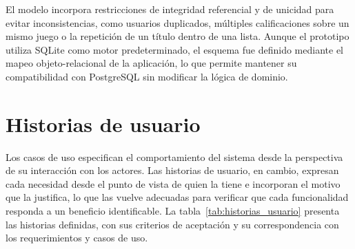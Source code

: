 El modelo incorpora restricciones de integridad referencial y de unicidad para evitar inconsistencias, como usuarios duplicados, múltiples calificaciones sobre un mismo juego o la repetición de un título dentro de una lista. Aunque el prototipo utiliza SQLite como motor predeterminado, el esquema fue definido mediante el mapeo objeto-relacional de la aplicación, lo que permite mantener su compatibilidad con PostgreSQL sin modificar la lógica de dominio.

\section{Historias de usuario}\label{sec:historias_usuario}

Los casos de uso especifican el comportamiento del sistema desde la perspectiva de su interacción con los actores. Las historias de usuario, en cambio, expresan cada necesidad desde el punto de vista de quien la tiene e incorporan el motivo que la justifica, lo que las vuelve adecuadas para verificar que cada funcionalidad responda a un beneficio identificable. La tabla~\ref{tab:historias_usuario} presenta las historias definidas, con sus criterios de aceptación y su correspondencia con los requerimientos y casos de uso.

